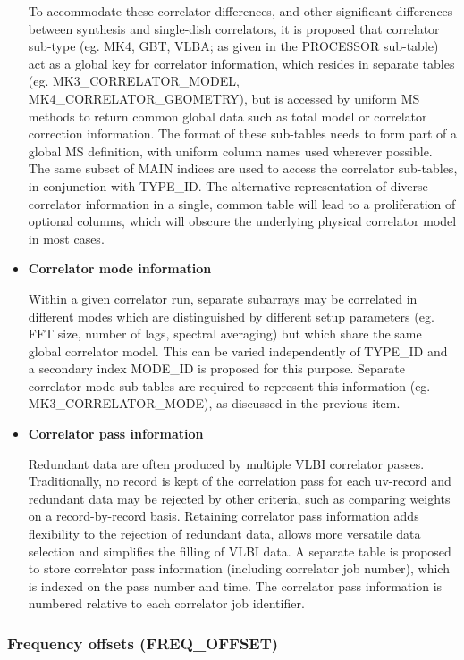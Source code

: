 \documentclass{article}
\begin{document}
\begin{itemize}
{To accommodate these correlator differences, and other significant
differences between synthesis and single-dish correlators, it is
proposed that correlator sub-type (eg. MK4, GBT, VLBA; as given in the
PROCESSOR sub-table) act as a global key for correlator information,
which resides in separate tables (eg. MK3\_CORRELATOR\_MODEL,
MK4\_CORRELATOR\_GEOMETRY), but is accessed by uniform MS methods to return
common global data such as total model or correlator correction
information. The format of these sub-tables needs to form part of a
global MS definition, with uniform column names used wherever
possible. The same subset of MAIN indices are used to access the
correlator sub-tables, in conjunction with TYPE\_ID. The alternative
representation of diverse correlator information in a single, common
table will lead to a proliferation of optional columns, which will
obscure the underlying physical correlator model in most cases.}


\item{{\bf Correlator mode information}

Within a given correlator run, separate subarrays may be correlated in
different modes which are distinguished by different setup parameters
(eg. FFT size, number of lags, spectral averaging) but which share the
same global correlator model. This can be varied independently of
TYPE\_ID and a secondary index MODE\_ID is
proposed for this purpose. Separate correlator mode sub-tables are
required to represent this information (eg. MK3\_CORRELATOR\_MODE), as
discussed in the previous item.}

\item{{\bf Correlator pass information}

Redundant data are often produced by multiple VLBI correlator
passes. Traditionally, no record is kept of the correlation pass for
each uv-record and redundant data may be rejected by other criteria,
such as comparing weights on a record-by-record basis. Retaining
correlator pass information adds flexibility to the rejection of
redundant data, allows more versatile data selection and simplifies
the filling of VLBI data. A separate table is proposed to store
correlator pass information (including correlator job number), which
is indexed on the pass number and time. The correlator pass
information is numbered relative to each correlator job identifier.}

\end{itemize}

\subsubsection{Frequency offsets (FREQ\_OFFSET)}
\end{document}
